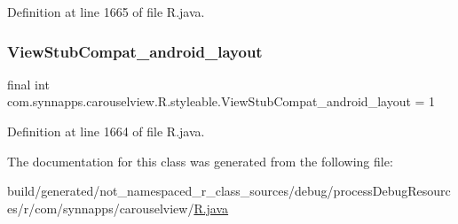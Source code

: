 Definition at line 1665 of file R.\+java.

\mbox{\label{classcom_1_1synnapps_1_1carouselview_1_1_r_1_1styleable_af546e3478608ea69370c5a3dec545a95}} 
\subsubsection{\texorpdfstring{ViewStubCompat\_android\_layout}{ViewStubCompat\_android\_layout}}
{\footnotesize\ttfamily final int com.\+synnapps.\+carouselview.\+R.\+styleable.\+View\+Stub\+Compat\+\_\+android\+\_\+layout = 1\hspace{0.3cm}{\ttfamily [static]}}



Definition at line 1664 of file R.\+java.



The documentation for this class was generated from the following file\+:\begin{DoxyCompactItemize}
\item 
build/generated/not\+\_\+namespaced\+\_\+r\+\_\+class\+\_\+sources/debug/process\+Debug\+Resources/r/com/synnapps/carouselview/\mbox{\hyperlink{com_2synnapps_2carouselview_2_r_8java}{R.\+java}}\end{DoxyCompactItemize}

